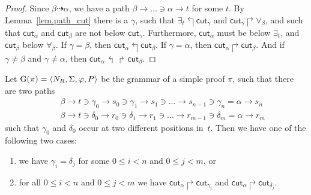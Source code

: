 \documentclass{LMCS}
\theoremstyle{plain}
\theoremstyle{definition}
\def\tuple#1{\langle#1\rangle}
\def\cutr{\mathsf{cut}}
\newcommand{\pathto}[1][]{\mathbin{\stackrel{#1}{\dashrightarrow}}}
\newcommand{\forallrr}[1]{\forall_{#1}}
\newcommand{\existsrr}[1]{\exists_{#1}}
\newcommand{\cutrr}[1]{\cutr_{#1}}
\newcommand{\leftabove}[2]{#1\mathbin{\Lsh}#2}
\newcommand{\rightabove}[2]{#2\mathbin{\Rsh}#1}
\newcommand{\rparallel}[2]{#1\mathbin{\Lsh\Rsh}#2}
\begin{document}
\begin{proof}
  Since $\beta\pathto{}\alpha$, we have a path
  $\beta\to\ldots\ni\alpha\to t$ for some $t$.  By
  Lemma~\ref{lem.path_cut} there is a $\gamma$, such that
$\leftabove{\existsrr t}{\cutrr{\gamma}}$ and 
  $\rightabove{\forallrr{\beta}}{\cutrr{\gamma}}$, and such that
 $\cutrr{\alpha}$ and $\cutrr{\beta}$ are not below
$\cutrr\gamma$. Furthermore, $\cutrr{\alpha}$ must be below
$\existsrr t$, and $\cutrr{\beta}$ below $\forallrr{\beta}$.
If $\gamma=\beta$, then $\leftabove{\cutrr{\alpha}}{\cutrr{\beta}}$. 
If $\gamma=\alpha$, then $\rightabove{\cutrr{\beta}}{\cutrr{\alpha}}$. 
And if $\gamma\neq\beta$ and $\gamma\neq\alpha$, then 
$\rparallel{\cutrr{\alpha}}{\cutrr{\beta}}$.
\end{proof}


\begin{lem}\label{lem.alphapos}
  Let $\Gram{\pi}=\tuple{N_R,\Sigma,\varphi,P}$ be the grammar of a
  simple proof $\pi$, such that there are two paths
  \begin{eqnarray*}
    &&\beta\to t\ni\gamma_0\to s_0\ni\gamma_1\to s_1\ni\ldots
    \to s_{n-1}\ni\gamma_n=\alpha\to s_n\\
    &&\beta\to t\ni\delta_0\to r_0\ni\delta_1\to r_1\ni\ldots
    \to r_{m-1}\ni\delta_m=\alpha\to r_m
  \end{eqnarray*}
  such that $\gamma_0$ and $\delta_0$ occur at two different positions
  in~$t$. Then we have
  one of the following two cases:
  \begin{enumerate}
  \item we have $\gamma_i=\delta_j$ for some $0\le i<n$ and $0\le j<m$, or \vadjust{\vskip.7ex}\item for all $0\le i<n$ and $0\le j<m$ we have\/
    $\rightabove{\cutrr{\gamma_i}}{\cutrr{\alpha}}$ and\/
    $\rightabove{\cutrr{\delta_j}}{\cutrr{\alpha}}$.
  \end{enumerate}
\end{lem}
\end{document}
